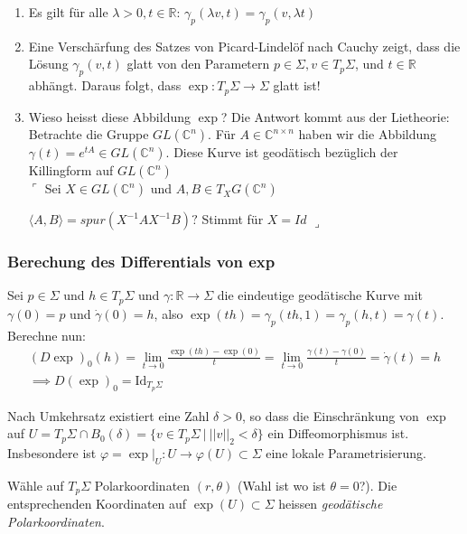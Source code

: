 \documentclass[../main.tex]{subfiles}
\begin{document}
\begin{remarks}

\leavevmode
\begin{enumerate}
    \item Es gilt für alle $\lambda > 0, t \in \mathbb{R}$: $\gamma_p(\lambda v, t) = \gamma_p(v,\lambda t)$
    \item Eine Verschärfung des Satzes von Picard-Lindelöf nach Cauchy zeigt,
    dass die Lösung $\gamma_p(v,t)$ glatt von den Parametern $p \in \Sigma, v \in T_p\Sigma$, und
    $t\in \mathbb{R}$ abhängt. Daraus folgt, dass $\exp : T_p\Sigma \to \Sigma$ glatt ist!

    \item Wieso heisst diese Abbildung $\exp$?
    Die Antwort kommt aus der Lietheorie: 
    Betrachte die Gruppe $GL(\mathbb{C}^n)$. Für $A \in \mathbb{C}^{n \times n}$ haben
    wir die Abbildung $\gamma(t)= e^{tA} \in GL(\mathbb{C}^n)$.
    Diese Kurve ist geodätisch bezüglich der Killingform auf $GL(\mathbb{C}^n)$\\
    $\ulcorner$ Sei $X \in GL(\mathbb{C}^n)$ und $A,B \in T_XG(\mathbb{C}^n)$

    $\langle A, B \rangle = spur (X^{-1}AX^{-1}B)?$ Stimmt für $X = Id$
    $\lrcorner$ 
\end{enumerate}

\end{remarks}

\subsubsection*{Berechung des Differentials von exp} 
Sei $p \in \Sigma$ und $h \in T_p\Sigma$ und $\gamma : \mathbb{R} \to \Sigma$
die eindeutige geodätische Kurve mit $\gamma(0)=p$ und $ \dot{\gamma}(0)=h$, also
$\exp (th)= \gamma_p(th,1) = \gamma_p(h,t)=\gamma(t)$.
Berechne nun:
\begin{align*}
    (D\exp)_0(h) = \lim_{t \to 0}\frac{\exp(th)-\exp(0)}{t} =
    \lim_{t \to 0} \frac{\gamma(t)-\gamma(0)}{t} =\dot{\gamma}(t)=h \\
    \implies D(\exp)_0 = \text{Id}_{T_p\Sigma}  
\end{align*}

Nach Umkehrsatz existiert eine Zahl $\delta > 0$, so dass die Einschränkung
von $\exp$ auf $U=T_p\Sigma \cap B_0(\delta) = \{v \in T_p\Sigma \ | \ ||v||_2 < \delta \}$
ein Diffeomorphismus ist. Insbesondere ist 
$\varphi = \exp \vert_U : U \to \varphi(U) \subset \Sigma$ eine lokale Parametrisierung. \\
\begin{minipage}{30em}
    Wähle auf $T_p\Sigma$ Polarkoordinaten $(r, \theta)$ (Wahl ist wo ist $\theta = 0$?).
Die entsprechenden Koordinaten auf $\exp (U) \subset \Sigma$ heissen \emph{geodätische
Polarkoordinaten}.
\end{minipage}
\begin{minipage}{10em}
\end{minipage}
\end{document}
